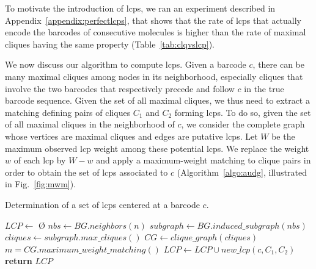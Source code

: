 To motivate the introduction of lcps, we ran an experiment described in Appendix~\ref{appendix:perfectlcps}, that shows that the rate of lcps that actually encode the barcodes of consecutive molecules is higher than the rate of maximal cliques having the same property (Table~\ref{tab:clqvslcp}).

We now discuss our algorithm to compute lcps.
Given a barcode $c$, there can be many maximal cliques among nodes in its neighborhood, especially cliques that involve the two barcodes that respectively precede and follow $c$ in the true barcode sequence.
Given the set of all maximal cliques, we thus need to extract a matching defining pairs of cliques $C_1$ and $C_2$ forming lcps.
To do so, given the set of all maximal cliques in the neighborhood of $c$, we consider the complete graph whose vertices are maximal cliques and edges are putative lcps.
Let $W$ be the maximum observed lcp weight among these potential lcps. 
We replace the weight $w$ of each lcp by $W-w$ and apply a maximum-weight matching to 
clique pairs in order to obtain the set of lcps associated to $c$ (Algorithm~\ref{algo:audg}, illustrated in Fig.~\ref{fig:mwm}).

\begin{algorithm}
    \caption{Determination of a set of lcps centered at a barcode $c$.}
    \label{algo:audg}
    \begin{algorithmic}[1] %
         
            \State $LCP \gets$ \O
            \State $nbs\gets BG.neighbors(n)$
            \State $subgraph \gets BG.induced\_subgraph(nbs)$
            \State $cliques \gets subgraph.max\_cliques()$ 
            \State $CG \gets clique\_graph(cliques)$ 
            \State $m = CG.maximum\_weight\_matching()$
                \State $LCP \gets LCP \cup new\_lcp(c, C_1, C_2)$ 
            \EndFor
            \State \textbf{return} $LCP$
        \EndProcedure
    \end{algorithmic}
\end{algorithm}

